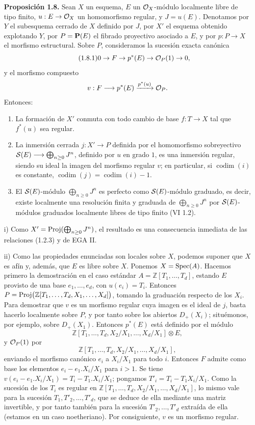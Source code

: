 \textbf{Proposición 1.8.} Sean \(X\) un esquema, \(E\) un \(\mathcal O_X\)-módulo localmente libre de tipo finito, \(u:E\to\mathcal O_X\) un homomorfismo regular, y \(J=u(E)\). Denotamos por \(Y\) el subesquema cerrado de \(X\) definido por \(J\), por \(X'\) el esquema obtenido explotando \(Y\), por \(P=\mathbf P(E)\) el fibrado proyectivo asociado a \(E\), y por \(p:P\to X\) el morfismo estructural. Sobre \(P\), consideramos la sucesión exacta canónica
\begin{equation}\tag{1.8.1}
0\to F\to p^*(E)\to\mathcal O_P(1)\to0,
\end{equation}
y el morfismo compuesto
\[
 v:F\longrightarrow p^*(E)\xrightarrow{p^*(u)}\mathcal O_P .
\]
Entonces:
\begin{enumerate}[label=\roman*)]
\item La formación de \(X'\) conmuta con todo cambio de base \(f:T\to X\) tal que \(f^*(u)\) sea regular.
\item La inmersión cerrada \(j:X'\to P\) definida por el homomorfismo sobreyectivo \(\mathcal S(E)\longrightarrow\bigoplus_{n\ge0}J^n\), definido por \(u\) en grado \(1\), es una inmersión regular, siendo su ideal la imagen del morfismo regular \(v\); en particular, si \(\operatorname{codim}(i)\) es constante, \(\operatorname{codim}(j)=\operatorname{codim}(i)-1\).
\item El \(\mathcal S(E)\)-módulo \(\bigoplus_{n\ge0}J^n\) es perfecto como \(\mathcal S(E)\)-módulo graduado, es decir, existe localmente una resolución finita y graduada de \(\bigoplus_{n\ge0}J^n\) por \(\mathcal S(E)\)-módulos graduados localmente libres de tipo finito (VI 1.2).
\end{enumerate}

i) Como \(X'=\operatorname{Proj}(\bigoplus_{n\ge0}J^n)\), el resultado es una consecuencia inmediata de las relaciones (1.2.3) y de EGA II.

ii) Como las propiedades enunciadas son locales sobre \(X\), podemos suponer que \(X\) es afín y, además, que \(E\) es libre sobre \(X\). Ponemos \(X=\operatorname{Spec}(A)\). Hacemos primero la demostración en el caso estándar \(A=\mathbb Z[T_1,\ldots,T_d]\), estando \(E\) provisto de una base \(e_1,\ldots,e_d\), con \(u(e_i)=T_i\). Entonces \(P=\operatorname{Proj}\bigl(\mathbb Z[T_1,\ldots,T_d,X_1,\ldots,X_d]\bigr)\), tomando la graduación respecto de los \(X_i\). Para demostrar que \(v\) es un morfismo regular cuya imagen es el ideal de \(j\), basta hacerlo localmente sobre \(P\), y por tanto sobre los abiertos \(D_+(X_i)\); situémonos, por ejemplo, sobre \(D_+(X_1)\). Entonces \(p^*(E)\) está definido por el módulo
\[
 \mathbb Z[T_1,\ldots,T_d,X_2/X_1,\ldots,X_d/X_1]\otimes E,
\]
y \(\mathcal O_P(1)\) por
\[
 \mathbb Z[T_1,\ldots,T_d,X_2/X_1,\ldots,X_d/X_1],
\]
enviando el morfismo canónico \(e_i\) a \(X_i/X_1\) para todo \(i\). Entonces \(F\) admite como base los elementos \(e_i-e_1.X_i/X_1\) para \(i>1\).
Se tiene \(v(e_i-e_1.X_i/X_1)=T_i-T_1.X_i/X_1\); pongamos \(T'_i=T_i-T_1X_i/X_1\).
Como la sucesión de los \(T_i\) es regular en \(\mathbb Z[T_1,\ldots,T_d,X_2/X_1,\ldots,X_d/X_1]\), lo mismo vale para la sucesión \(T_1,T'_2,\ldots,T'_d\), que se deduce de ella mediante una matriz invertible, y por tanto también para la sucesión \(T'_2,\ldots,T'_d\) extraída de ella (estamos en un caso noetheriano). Por consiguiente, \(v\) es un morfismo regular.

